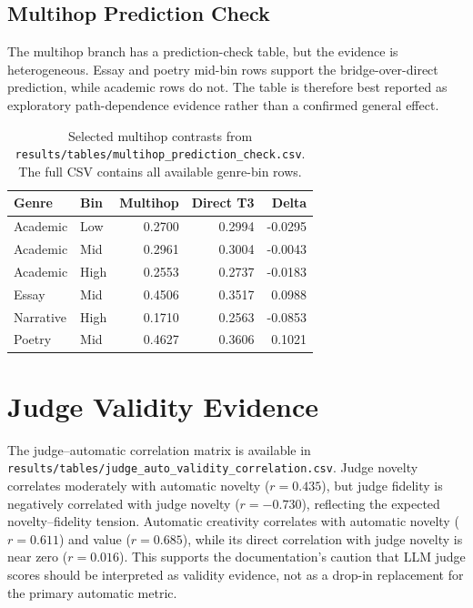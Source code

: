 \documentclass[sigconf,nonacm]{acmart}
\begin{document}
\subsection{Multihop Prediction Check}

The multihop branch has a prediction-check table, but the evidence is heterogeneous.
Essay and poetry mid-bin rows support the bridge-over-direct prediction, while academic rows do not.
The table is therefore best reported as exploratory path-dependence evidence rather than a confirmed general effect.

\begin{table}[t]
\centering
\small
\begin{tabular}{llrrr}
\toprule
Genre & Bin & Multihop & Direct T3 & Delta \\
\midrule
Academic & Low & 0.2700 & 0.2994 & -0.0295 \\
Academic & Mid & 0.2961 & 0.3004 & -0.0043 \\
Academic & High & 0.2553 & 0.2737 & -0.0183 \\
Essay & Mid & 0.4506 & 0.3517 & 0.0988 \\
Narrative & High & 0.1710 & 0.2563 & -0.0853 \\
Poetry & Mid & 0.4627 & 0.3606 & 0.1021 \\
\bottomrule
\end{tabular}
\caption{Selected multihop contrasts from \texttt{results/tables/multihop\_prediction\_check.csv}. The full CSV contains all available genre-bin rows.}
\label{tab:multihop}
\end{table}

\section{Judge Validity Evidence}

The judge--automatic correlation matrix is available in \texttt{results/tables/judge\_auto\_validity\_correlation.csv}.
Judge novelty correlates moderately with automatic novelty ($r=0.435$), but judge fidelity is negatively correlated with judge novelty ($r=-0.730$), reflecting the expected novelty--fidelity tension.
Automatic creativity correlates with automatic novelty ($r=0.611$) and value ($r=0.685$), while its direct correlation with judge novelty is near zero ($r=0.016$).
This supports the documentation's caution that LLM judge scores should be interpreted as validity evidence, not as a drop-in replacement for the primary automatic metric.
\end{document}
